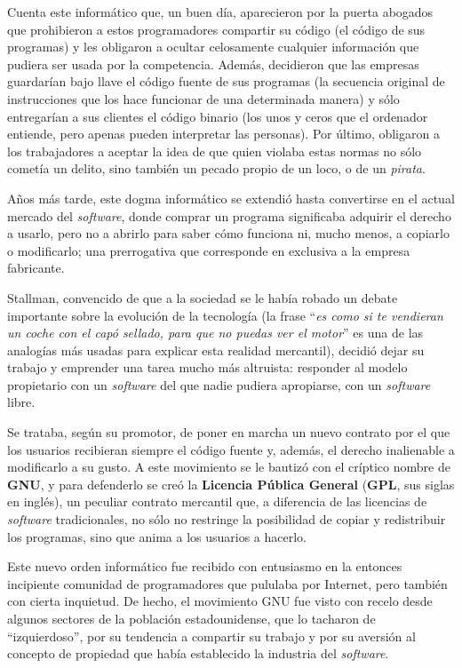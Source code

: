 Cuenta este  informático que, un  buen día, aparecieron por  la puerta
abogados que prohibieron a estos programadores compartir su código (el
código  de  sus  programas)  y les  obligaron  a  ocultar  celosamente
cualquier  información  que  pudiera  ser usada  por  la  competencia.
Además, decidieron  que las empresas  guardarían bajo llave  el código
fuente de  sus programas (la  secuencia original de  instrucciones que
los hace funcionar de una determinada manera) y sólo entregarían a sus
clientes  el  código  binario  (los  unos y  ceros  que  el  ordenador
entiende, pero  apenas pueden  interpretar las personas).  Por último,
obligaron a  los trabajadores a aceptar  la idea de que  quien violaba
estas normas no sólo cometía un  delito, sino también un pecado propio
de un loco, o de un {\em pirata}.

Años más tarde,  este dogma informático se  extendió hasta convertirse
en el  actual mercado  del {\em software},  donde comprar  un programa
significaba  adquirir el  derecho a  usarlo,  pero no  a abrirlo  para
saber cómo  funciona ni,  mucho menos, a  copiarlo o  modificarlo; una
prerrogativa que corresponde en exclusiva a la empresa fabricante.

Stallman, convencido de que a la sociedad se le había robado un debate
importante sobre  la evolución  de la tecnología  (la frase  ``{\it es
como si te vendieran un coche con  el capó sellado, para que no puedas
ver el motor}'' es una de  las analogías más usadas para explicar esta
realidad mercantil),  decidió dejar su  trabajo y emprender  una tarea
mucho  más altruista:  responder  al modelo  propietario  con un  {\em
software}  del que  nadie pudiera  apropiarse, con  un {\em  software}
libre.

Se trataba,  según su promotor, de  poner en marcha un  nuevo contrato
por el que los usuarios recibieran siempre el código fuente y, además,
el derecho inalienable a modificarlo a  su gusto. A este movimiento se
le  bautizó  con el  críptico  nombre  de {\bf  GNU},  y para defenderlo  se creó la {\bf  Licencia Pública
General}  ({\bf GPL},  sus siglas  en inglés),  un peculiar
contrato  mercantil  que,  a  diferencia  de  las  licencias  de  {\em
software} tradicionales, no sólo no restringe la posibilidad de copiar
y redistribuir los programas, sino que anima a los usuarios a hacerlo.

Este  nuevo  orden  informático  fue recibido  con  entusiasmo  en  la
entonces  incipiente  comunidad  de  programadores  que  pululaba  por
Internet, pero también  con cierta inquietud. De  hecho, el movimiento
GNU  fue visto  con  recelo  desde algunos  sectores  de la  población
estadounidense, que lo tacharon de ``izquierdoso'', por su tendencia a
compartir su  trabajo y por su  aversión al concepto de  propiedad que
había establecido la industria del {\em software}.

